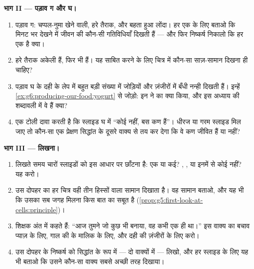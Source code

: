 \begin{problem}[{सप्ताहांत समस्या --- चार स्लाइडें, एक
सिद्धांत}]
\medskip\noindent\textbf{भाग II --- पड़ाव ग और घ।}
\begin{enumerate}[resume]
  \item पड़ाव ग: चप्पल-नुमा खेने वाली, हरे तैराक, और बहता हुआ लोंदा।
        हर एक के लिए बताओ कि मिनट भर देखने में जीवन की कौन-सी
        गतिविधियाँ दिखती हैं --- और फिर निष्कर्ष निकालो कि हर एक है
        क्या।
  \item हरे तैराक अकेली  हैं, फिर भी  हैं। यह साबित करने
        के लिए चित्र में कौन-सा साज़-सामान दिखना ही चाहिए?
  \item पड़ाव घ के दही के लेप में बहुत बड़ी संख्या में जोड़ियों और
        ज़ंजीरों में बँधी नन्ही  दिखती हैं। इन्हें
        \cref{ex:g6:producing-our-food:yogurt} से जोड़ो: इन  ने
         का क्या किया, और इस अध्याय की शब्दावली में वे हैं क्या?
  \item एक टोली दावा करती है कि स्लाइड घ में ``कोई  नहीं, बस कण
        हैं''। धीरज या गरम स्लाइड मिल जाए तो कौन-सा एक प्रेक्षण 
        सिद्धांत के दूसरे वाक्य से तय कर देगा कि वे कण जीवित हैं या
        नहीं?
\end{enumerate}

\medskip\noindent\textbf{भाग III --- लिखना।}
\begin{enumerate}[resume]
  \item लिखते समय चारों स्लाइडों को इस आधार पर छाँटना है: एक  या
        कई? , , या इनमें से कोई नहीं? यह करो।
  \item उस दोपहर का हर चित्र वही तीन हिस्सों वाला सामान दिखाता है। वह
        सामान बताओ, और यह भी कि उसका सब जगह मिलना किस बात का सबूत है
        (\cref{prop:g5:first-look-at-cells:principle})।
  \item शिक्षक अंत में कहते हैं: ``आज तुमने जो कुछ भी बनाया, वह कभी एक
        ही  था।'' इस वाक्य का बचाव प्याज़ के लिए, गाल की
         के मालिक के लिए, और दही की ज़ंजीरों के लिए करो।
  \item उस दोपहर के निष्कर्ष को  सिद्धांत के रूप में --- दो
        वाक्यों में --- लिखो, और हर स्लाइड के लिए यह भी बताओ कि उसने
        कौन-सा वाक्य सबसे अच्छी तरह दिखाया।
\end{enumerate}
\end{problem}
